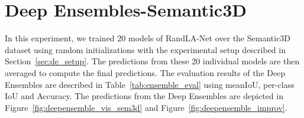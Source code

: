     \section{Deep Ensembles-Semantic3D}
    \label{sec:deepensemble_train}
    In this experiment, we trained 20 models of RandLA-Net over the Semantic3D dataset using random initializations with the experimental setup described in Section~\ref{sec:de_setup}.
    The predictions from these 20 individual models are then averaged to compute the final predictions.
    The evaluation results of the Deep Ensembles are described in Table~\ref{tab:ensemble_eval} using meanIoU, per-class IoU and Accuracy.
    The predictions from the Deep Ensembles are depicted in Figure~\ref{fig:deepensemble_vis_sem3d} and Figure~\ref{fig:deepensemble_improv}.
    \begin{table}[h!]
        \caption{Illustration of performance of RandLA-Net on Semantic3D over ensemble size. meanIOU, IOU per-class and overall accuracy are represented here.
        C1 to C8 are the classes of Semantic3D which are Manmade terrain, Natural terrain, High vegetation, Low vegetation, Buildings, Hardscapes, Scanning artefacts, and Cars.}
        \label{tab:ensemble_eval}
    \end{table} 

